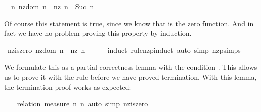 \begin{isabellebody}
\begin{isamarkuptxt}
  \begin{isabelle}%
\ {}{}\ {}n{}\ nz{}dom\ n\ {}\ nz\ n\ {}\ Suc\ n%
\end{isabelle}

  Of course this statement is true, since we know that  is
  the zero function. And in fact we have no problem proving this
  property by induction.%
\end{isamarkuptxt}%
\isamarkuptrue%
%
\endisatagproof
{\isafoldproof}%
%
\isadelimproof
%
\endisadelimproof
{}\isamarkupfalse%
\ nz{}is{}zero{}\ {}nz{}dom\ n\ {}\ nz\ n\ {}\ {}{}\isanewline
%
\isadelimproof
\ \ %
\endisadelimproof
%
\isatagproof
{}\isamarkupfalse%
\ {}induct\ rule{}nz{}pinduct{}\ {}auto\ simp{}\ nz{}psimps{}%
\endisatagproof
{\isafoldproof}%
%
\isadelimproof
%
\endisadelimproof
%
\begin{isamarkuptext}%
We formulate this as a partial correctness lemma with the condition
  . This allows us to prove it with the  rule before we have proved termination. With this lemma,
  the termination proof works as expected:%
\end{isamarkuptext}%
\isamarkuptrue%
\isamarkupfalse%
\isanewline
%
\isadelimproof
\ \ %
\endisadelimproof
%
\isatagproof
{}\isamarkupfalse%
\ {}relation\ {}measure\ {}{}n{}\ n{}{}{}\ {}auto\ simp{}\ nz{}is{}zero{}%

\end{isabellebody}
